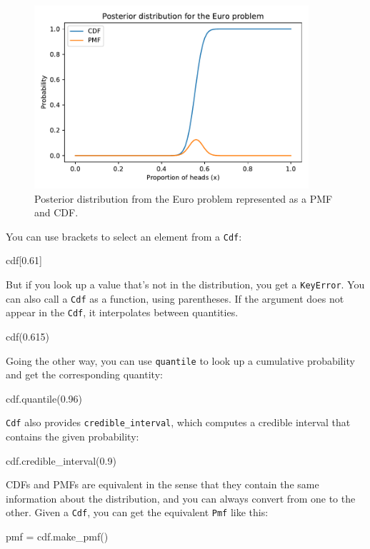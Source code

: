 \documentclass[12pt]{book}
\theoremstyle{exercise}
\newcommand{\py}[1]{{\tt #1}}%
\begin{document}
\begin{figure}
\centerline{\includegraphics[width=4in]{figs/fig06-01.pdf}}
\caption{Posterior distribution from the Euro problem represented as a PMF and CDF.}
\label{fig06-01}
\end{figure}

You can use brackets to select an element from a \py{Cdf}:

\begin{code}
cdf[0.61]
\end{code}

But if you look up a value that's not in the distribution, you get a \py{KeyError}.
You can also call a \py{Cdf} as a function, using parentheses.
If the argument does not appear in the \py{Cdf}, it interpolates between quantities.

\begin{code}
cdf(0.615)
\end{code}

Going the other way, you can use \py{quantile} to look up a cumulative probability and get the corresponding quantity:

\begin{code}
cdf.quantile(0.96)
\end{code}

\py{Cdf} also provides \py{credible_interval}, which computes a credible interval that contains the given probability:

\begin{code}
cdf.credible_interval(0.9)
\end{code}

CDFs and PMFs are equivalent in the sense that they contain the
same information about the distribution, and you can always convert
from one to the other.
Given a \py{Cdf}, you can get the equivalent \py{Pmf} like this:

\begin{code}
pmf = cdf.make_pmf()
\end{code}
\end{document}
